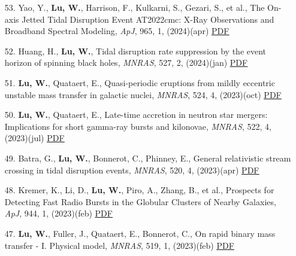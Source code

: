 \begin{itemize}[leftmargin=0.65cm]
\vspace{-0.1cm}
\item[53.]{Yao, Y., {\bf Lu, W.}, Harrison, F., Kulkarni, S., Gezari, S., et al., {The On-axis Jetted Tidal Disruption Event AT2022cmc: X-Ray Observations and Broadband Spectral Modeling}, {\it ApJ}, 965, 1, (2024)(apr) \href{https://ui.adsabs.harvard.edu/abs/2024ApJ...965...39Y}{\underline{PDF}}}

\vspace{-0.1cm}
\item[52.]{Huang, H., {\bf Lu, W.}, {Tidal disruption rate suppression by the event horizon of spinning black holes}, {\it MNRAS}, 527, 2, (2024)(jan) \href{https://ui.adsabs.harvard.edu/abs/2024MNRAS.527.1865H}{\underline{PDF}}}

\vspace{-0.1cm}
\item[51.]{{\bf Lu, W.}, Quataert, E., {Quasi-periodic eruptions from mildly eccentric unstable mass transfer in galactic nuclei}, {\it MNRAS}, 524, 4, (2023)(oct) \href{https://ui.adsabs.harvard.edu/abs/2023MNRAS.524.6247L}{\underline{PDF}}}

\vspace{-0.1cm}
\item[50.]{{\bf Lu, W.}, Quataert, E., {Late-time accretion in neutron star mergers: Implications for short gamma-ray bursts and kilonovae}, {\it MNRAS}, 522, 4, (2023)(jul) \href{https://ui.adsabs.harvard.edu/abs/2023MNRAS.522.5848L}{\underline{PDF}}}

\vspace{-0.1cm}
\item[49.]{Batra, G., {\bf Lu, W.}, Bonnerot, C., Phinney, E., {General relativistic stream crossing in tidal disruption events}, {\it MNRAS}, 520, 4, (2023)(apr) \href{https://ui.adsabs.harvard.edu/abs/2023MNRAS.520.5192B}{\underline{PDF}}}

\vspace{-0.1cm}
\item[48.]{Kremer, K., Li, D., {\bf Lu, W.}, Piro, A., Zhang, B., et al., {Prospects for Detecting Fast Radio Bursts in the Globular Clusters of Nearby Galaxies}, {\it ApJ}, 944, 1, (2023)(feb) \href{https://ui.adsabs.harvard.edu/abs/2023ApJ...944....6K}{\underline{PDF}}}

\vspace{-0.1cm}
\item[47.]{{\bf Lu, W.}, Fuller, J., Quataert, E., Bonnerot, C., {On rapid binary mass transfer - I. Physical model}, {\it MNRAS}, 519, 1, (2023)(feb) \href{https://ui.adsabs.harvard.edu/abs/2023MNRAS.519.1409L}{\underline{PDF}}}


\end{itemize}

